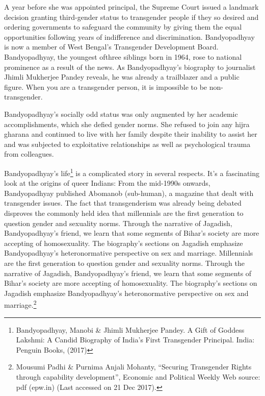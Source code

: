 \begin{multicols}{2}

\noi
A year before she was appointed principal, the Supreme Court issued a landmark decision
granting third-gender status to transgender people if they so desired and ordering governments
to safeguard the community by giving them the equal opportunities following years of
indifference and discrimination. Bandyopadhyay is now a member of West Bengal's
Transgender Development Board. Bandyopadhyay, the youngest ofthree siblings born in 1964,
rose to national prominence as a result of the news. As Bandyopadhyay's biography to
journalist Jhimli Mukherjee Pandey reveals, he was already a trailblazer and a public figure.
When you are a transgender person, it is impossible to be non-transgender.

\noi
Bandyopadhyay's socially odd status was only augmented by her academic accomplishments,
which she defied gender norms. She refused to join any hijra gharana and continued to live
with her family despite their inability to assist her and was subjected to exploitative
relationships as well as psychological trauma from colleagues.

\noi
Bandyopadhyay's life\footnote{Bandyopadhyay, Manobi \& Jhimli Mukherjee Pandey. A Gift of Goddess Lakshmi: A Candid Biography of India’s First Transgender Principal. India: Penguin Books, (2017)} is a complicated story in several respects. It's a fascinating look at the origins of queer Indians: From the mid-1990s onwards, Bandyopadhyay published Abomanob (sub-human), a magazine that dealt with transgender issues. The fact that transgenderism was already being debated disproves the commonly held idea that millennials are the first generation to question gender and sexuality norms. Through the narrative of Jagadish, Bandyopadhyay's friend, we learn that some segments of Bihar's society are more accepting of homosexuality. The biography's sections on Jagadish emphasize Bandyopadhyay's heteronormative perspective on sex and marriage. Millennials are the first generation to question gender and sexuality norms. Through the narrative of Jagadish, Bandyopadhyay's friend, we learn that some segments of Bihar's society are more accepting of homosexuality. The biography's sections on Jagadish emphasize Bandyopadhyay's heteronormative perspective on sex and marriage.\footnote{Mousumi Padhi \& Purnima Anjali Mohanty, “Securing Transgender Rights through capability development”, Economic and Political Weekly Web source: pdf (epw.in) (Last accessed on 21 Dec 2017).}


\end{multicols}
